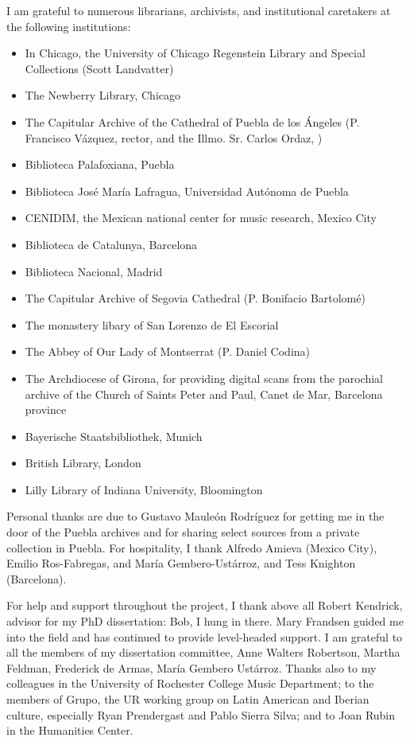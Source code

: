 I am grateful to numerous librarians, archivists, and institutional
caretakers at the following institutions:
\begin{itemize}
    \item In Chicago, the University of Chicago Regenstein Library and Special
        Collections (Scott Landvatter)
    \item The Newberry Library, Chicago
    \item The Capitular Archive of the Cathedral of Puebla de los Ángeles
        (P. Francisco Vázquez, rector, and the Illmo. Sr. Carlos
        Ordaz, )
    \item Biblioteca Palafoxiana, Puebla
    \item Biblioteca José María Lafragua, Universidad Autónoma de Puebla
    \item CENIDIM, the Mexican national center for music research, Mexico
        City
    \item Biblioteca de Catalunya, Barcelona
    \item Biblioteca Nacional, Madrid
    \item The Capitular Archive of Segovia Cathedral (P. Bonifacio Bartolomé)
    \item The monastery libary of San Lorenzo de El Escorial
    \item The Abbey of Our Lady of Montserrat (P. Daniel Codina)
    \item The Archdiocese of Girona, for providing digital scans from the
        parochial archive of the Church of Saints Peter and Paul, Canet de
        Mar, Barcelona province
    \item Bayerische Staatsbibliothek, Munich
    \item British Library, London
    \item Lilly Library of Indiana University, Bloomington
\end{itemize}
Personal thanks are due to Gustavo Mauleón Rodríguez for getting me in the
door of the Puebla archives and for sharing select sources from a private
collection in Puebla.
For hospitality, I thank Alfredo Amieva (Mexico City), Emilio Ros-Fabregas,
and María Gembero-Ustárroz, and Tess Knighton (Barcelona).

For help and support throughout the project, I thank above all Robert Kendrick,
advisor for my PhD dissertation: Bob, I hung in there. 
Mary Frandsen guided me into the field and has continued to provide
level-headed support.
I am grateful to all the members of my dissertation committee, Anne Walters
Robertson, Martha Feldman, Frederick de Armas, María Gembero Ustárroz.
Thanks also to my colleagues in the University of Rochester College Music
Department; to the members of Grupo, the UR working group on Latin American
and Iberian culture, especially Ryan Prendergast and Pablo Sierra
Silva; and to Joan Rubin in the Humanities Center.

